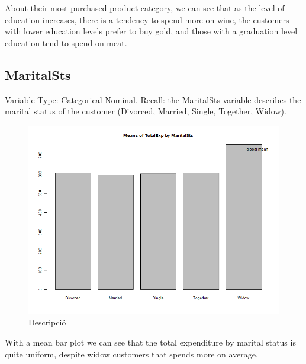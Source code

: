 About their most purchased product category, we can see that as the level of education increases, there is a tendency to spend more on wine, the customers with lower education levels prefer to buy gold, and those with a graduation level education tend to spend on meat.

\newpage
\subsection{MaritalSts}
Variable Type: Categorical Nominal. 
Recall: the MaritalSts variable describes the marital status of the customer (Divorced, Married, Single, Together, Widow).

\begin{figure}[H]
    \centering
    \includegraphics[width= 1\linewidth]{Imatges/mean_barplot_TotalExp(2).png}
    \caption{Descripció}
    \label{fig:scree_plot_5} %
\end{figure}

With a mean bar plot we can see that the total expenditure by marital status is quite uniform, despite widow customers that spends more on average.

